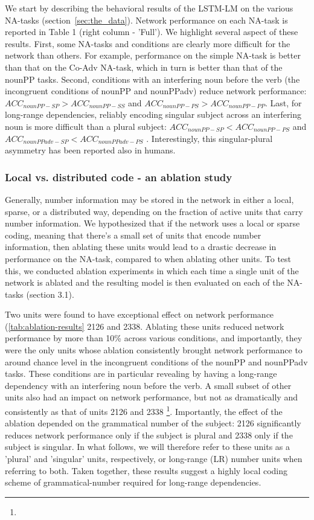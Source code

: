 We start by describing the behavioral results of the LSTM-LM on the various NA-tasks (section~\ref{sec:the_data}). Network performance on each NA-task is reported in Table 1 (right column - 'Full'). We highlight several aspect of these results. First, some NA-tasks and conditions are clearly more difficult for the network than others. For example, performance on the simple NA-task is better than that on the Co-Adv NA-task, which in turn is better than that of the nounPP tasks. Second, conditions with an interfering noun before the verb (the incongruent conditions of nounPP and nounPPadv) reduce network performance: $ACC_{nounPP-SP}>ACC_{nounPP-SS}$ and $ACC_{nounPP-PS}>ACC_{nounPP-PP}$. Last, for long-range dependencies, reliably encoding singular subject across an interfering noun is more difficult than a plural subject: $ACC_{nounPP-SP}<ACC_{nounPP-PS}$ and $ACC_{nounPPadv-SP}<ACC_{nounPPadv-PS}$ . Interestingly, this singular-plural asymmetry has been reported also in humans. 

\subsubsection{Local vs. distributed code - an ablation study}
Generally, number information may be stored in the network in either a local, sparse, or a distributed way, depending on the fraction of active units that carry number information. 
We hypothesized that if the network uses a local or sparse coding, meaning that there's a small set of units that encode number information, then ablating these units would lead to a drastic decrease in performance on the NA-task, compared to when ablating other units. 
To test this, we conducted ablation experiments in which each time a single unit of the network is ablated and the resulting model is then evaluated on each of the NA-tasks (section 3.1). 

Two units were found to have exceptional effect on network performance (\ref{tab:ablation-results} \unit{2}{126} and \unit{2}{338}. Ablating these units reduced network performance by more than 10\% across various conditions, and importantly, they were the only units whose ablation consistently brought network performance to around chance level in the incongruent conditions of the nounPP and nounPPadv tasks. These conditions are in particular revealing by having a long-range dependency with an interfering noun before the verb. A small subset of other units also had an impact on network performance, but not as dramatically and consistently as that of units \unit{2}{126} and \unit{2}{338} \footnote{}. Importantly, the effect of the ablation depended on the grammatical number of the subject: \unit{2}{126} significantly reduces network performance only if the subject is plural and \unit{2}{338} only if the subject is singular. In what follows, we will therefore refer to these units as a 'plural' and 'singular' units, respectively, or long-range (LR) number units when referring to both. Taken together, these results suggest a highly local coding scheme of grammatical-number required for long-range dependencies. 

